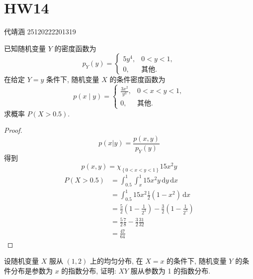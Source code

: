 \documentclass[../main.tex]{subfiles}
\begin{document}
\ifSubfilesClassLoaded{

    
    \setcounter{chapter}{13}
}{}

\chapter{ HW14 }
代靖涵 25120222201319

\begin{exercise}{}{}
已知随机变量 $Y$ 的密度函数为
\[
p_Y(y) = \begin{cases} 5y^4, & 0 < y < 1, \\ 0, & \text{其他}. \end{cases}
\]
在给定 $Y=y$ 条件下, 随机变量 $X$ 的条件密度函数为
\[
p(x \mid y) = \begin{cases} \frac{3x^2}{y^3}, & 0 < x < y < 1, \\ 0, & \text{其他}. \end{cases}
\]
求概率 $P(X>0.5)$.
\end{exercise}

\begin{proof}
     \[
     p\left( x|y \right)= \frac{p\left( x,y \right)  }{p_{Y}\left( y \right)  }  
     \]得到 \[
     p\left( x,y \right)= \chi _{\left\{ 0< x< y< 1 \right\}}15x^{2}y 
     \]
     \[
    \begin{aligned}
     P\left( X> 0.5 \right)&= \int_{0.5}^{1} \int_{x}^{1} 15x^{2}y\,\mathrm{d} y\,\mathrm{d} x  \\ 
      &= \int_{0.5}^{1} 15x^{2} \frac{1}{2}\left( 1-x^{2} \right)\,\mathrm{d} x\\ 
       &= \frac{5 }{2 }\left( 1-\frac{1}{2^{3}} \right)- \frac{3}{2}\left( 1-\frac{1}{2^{5}} \right)\\ 
        &= \frac{5 }{2 }\frac{7 }{8 }- \frac{3}{2}\frac{31 }{32 }\\ 
         &= \frac{ 47 }{64 }      
    \end{aligned}
     \]
\end{proof}

\begin{exercise}{}{}
设随机变量 $X$ 服从 $(1,2)$ 上的均匀分布, 在 $X=x$ 的条件下, 随机变量 $Y$ 的条件分布是参数为 $x$ 的指数分布, 证明: $XY$ 服从参数为 1 的指数分布.
\end{exercise}
\end{document}
